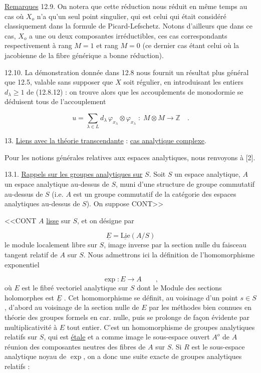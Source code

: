 \underline{Remarques} 12.9. On notera que cette réduction nous réduit en même temps au cas où $X_{o}$ n'a qu'un seul point singulier, qui est celui qui était considéré classiquement dans la formule de Picard-Lefschetz. Notons d'ailleurs que dans ce cas, $X_{o}$ a une ou deux composantes irréductibles, ces cas correspondants respectivement à rang $M = 1$ et rang $M = 0$ (ce dernier cas étant celui où la jacobienne de la fibre générique a bonne réduction).

12.10.  La démonstration donnée dans 12.8 nous fournit un résultat plus général que 12.5, valable sans supposer que $X$ soit régulier, en introduisant les entiers $d_{\lambda} \geqslant 1$ de (12.8.12) : on trouve alors que les accouplements de monodormie se déduisent tous de l'accouplement

\begin{equation}\tag{12.10.1}
u = \sum_{\lambda \in L} d_{\lambda} \, \varphi_{x_{\lambda}} \otimes \varphi_{x_{\lambda}} \; : \; M \otimes M \longrightarrow \mathbb{Z} \quad .
\end{equation}

13.  \underline{Liens avec la théorie transcendante} : \underline{cas analytique complexe}.

Pour les notions générales relatives aux espaces analytiques, nous renvoyons à [2].

13.1.  \underline{Rappels sur les groupes analytiques sur} $S$.  Soit $S$ un espace analytique, $A$ un espace analytique au-dessus de $S$, muni d'une structure de groupe commutatif au-dessus de $S$ (i.e. $A$ est un groupe commutatif de la catégorie des espaces analytiques au-dessus de $S$). On suppose CONT>>



<<CONT $A$ \underline{lisse} sur $S$, et on désigne par

\begin{equation}\tag{13.1.1}
\underline{E} = \underline{\mathrm{Lie}}(A/S)
\end{equation}
le module localement libre sur $S$, image inverse par la section nulle du faisceau tangent relatif de $A$ sur $S$. Nous admettrons ici la définition de l'homomorphisme exponentiel

\begin{equation}\tag{13.1.2}
\exp: E \longrightarrow A \qquad ,
\end{equation}
où $E$ est le fibré vectoriel analytique sur $S$ dont le Module des sections holomorphes est $\underline{E}$ . Cet homomorphisme se définit, au voisinage d'un point $s \in S$, d'abord au voisinage de la section nulle de $E$ par les méthodes bien connues en théorie des groupes formels en car. nulle, puis se prolonge de façon évidente par multiplicativité à $E$ tout entier. C'est un homomorphisme de groupes analytiques relatifs sur $S$, qui est \underline{étale} et a comme image le sous-espace ouvert $A^{o}$ de $A$ réunion des composantes neutres des fibres de $A$ sur $S$. Si $R$ est le sous-espace analytique noyau de $\exp$, on a donc une suite exacte de groupes analytiques relatifs :

